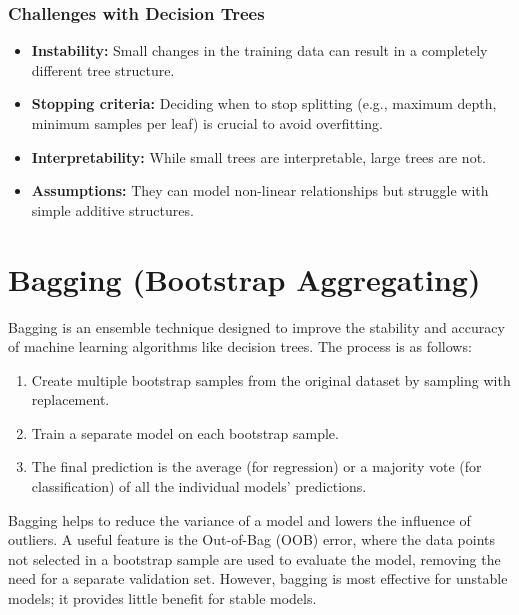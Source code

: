 \documentclass{article}
\begin{document}
\begin{multicols}{2}
\subsubsection{Challenges with Decision Trees}
\begin{itemize}
    \item \textbf{Instability:} Small changes in the training data can result in a completely different tree structure.
    \item \textbf{Stopping criteria:} Deciding when to stop splitting (e.g., maximum depth, minimum samples per leaf) is crucial to avoid overfitting.
    \item \textbf{Interpretability:} While small trees are interpretable, large trees are not.
    \item \textbf{Assumptions:} They can model non-linear relationships but struggle with simple additive structures.
\end{itemize}

\section{Bagging (Bootstrap Aggregating)}
Bagging is an ensemble technique designed to improve the stability and accuracy of machine learning algorithms like decision trees.
The process is as follows:
\begin{enumerate}
    \item Create multiple bootstrap samples from the original dataset by sampling with replacement.
    \item Train a separate model on each bootstrap sample.
    \item The final prediction is the average (for regression) or a majority vote (for classification) of all the individual models' predictions.
\end{enumerate}
Bagging helps to reduce the variance of a model and lowers the influence of outliers. A useful feature is the Out-of-Bag (OOB) error, where the data points not selected in a bootstrap sample are used to evaluate the model, removing the need for a separate validation set. However, bagging is most effective for unstable models; it provides little benefit for stable models.


\end{multicols}
\end{document}
